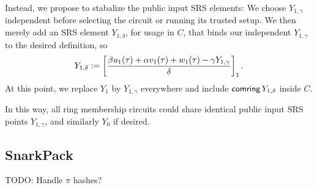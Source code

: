 Instead, we propose to stabalize the public input SRS elements:
We choose $Y_{1,\gamma}$ independent before selecting the circuit
 or running its trusted setup.
We then merely add an SRS element $Y_{1,\delta}$, for usage in $C$, that binds
 our independent $Y_{1,\gamma}$ to the desired definition, so
$$ Y_{1,\delta} := \left[ {\beta u_1(\tau) + \alpha v_1(\tau) + w_1(\tau) - \gamma Y_{1,\gamma} \over \delta} \right]_1 . $$
At this point, we replace $Y_1$ by $Y_{1,\gamma}$ everywhere and
 include $\mathsf{comring} \, Y_{1,\delta}$ inside $C$.

In this way, all ring membership circuits could share identical
public input SRS points $Y_{1,\gamma}$, and similarly $Y_0$ if desired.


\subsection{SnarkPack}

TODO: Handle $\pi$ hashes?


